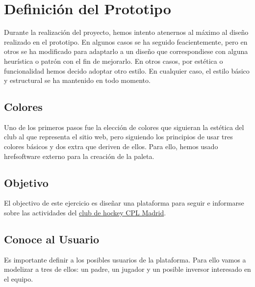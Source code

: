 \documentclass[10pt, spanish, pdftex]{template/UC3M_document}
\author{Alejandro Prieto Macías}         %
\begin{document}
\titleMain

\begin{spacing}{0.5}
    \hypersetup{linkcolor=black}    %
    \tableofcontents\newpage        %
\end{spacing}


\section{Definición del Prototipo}\label{prototipo}
Durante la realización del proyecto, hemos intento atenernos al máximo al diseño realizado en el prototipo.
En algunos casos se ha seguido feacientemente, pero en otros se ha modificado para adaptarlo a un diseño que correspondiese con alguna heurística o patrón con el fin de mejorarlo. En otros casos, por estética o funcionalidad hemos decido adoptar otro estilo. En cualquier caso, el estilo básico y estructural se ha mantenido en todo momento.

\subsection{Colores}
Uno de los primeros pasos fue la elección de colores que siguieran la estética del club al que representa el sitio web, pero siguiendo los principios de usar tres colores básicos y dos extra que deriven de ellos. Para ello, hemos usado href{}{software externo} para la creación de la paleta.










\subsection{Objetivo}
El objectivo de este ejercicio es diseñar una plataforma para seguir e informarse sobre las actividades del \href{http://www.cplmadrid.com}{club de hockey CPL Madrid}.

\subsection{Conoce al Usuario}
Es importante definir a los posibles usuarios de la plataforma. Para ello vamos a modelizar a tres de ellos: un padre, un jugador y un posible inversor interesado en el equipo.
\end{document}
